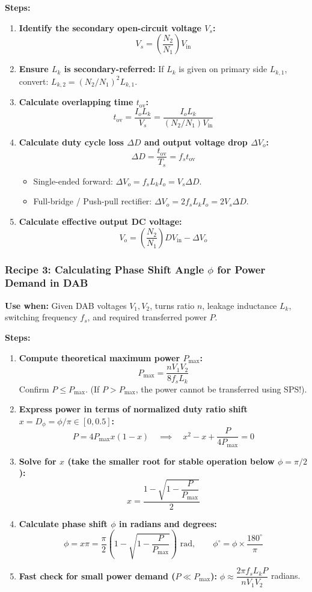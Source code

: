 \textbf{Steps:}
\begin{enumerate}
  \item \textbf{Identify the secondary open-circuit voltage $V_s$:}
  \[
  V_s = \left(\frac{N_2}{N_1}\right) V_{\mathrm{in}}
  \]
  \item \textbf{Ensure $L_k$ is secondary-referred:}
  If $L_k$ is given on primary side $L_{k,1}$, convert: $L_{k,2} = (N_2/N_1)^2 L_{k,1}$.
  \item \textbf{Calculate overlapping time $t_{\mathrm{ov}}$:}
  \[
  t_{\mathrm{ov}} = \frac{I_o L_k}{V_s} = \frac{I_o L_k}{(N_2/N_1) V_{\mathrm{in}}}
  \]
  \item \textbf{Calculate duty cycle loss $\Delta D$ and output voltage drop $\Delta V_o$:}
  \[
  \Delta D = \frac{t_{\mathrm{ov}}}{T_s} = f_s t_{\mathrm{ov}}
  \]
  \begin{itemize}
    \item Single-ended forward: $\Delta V_o = f_s L_k I_o = V_s \Delta D$.
    \item Full-bridge / Push-pull rectifier: $\Delta V_o = 2 f_s L_k I_o = 2 V_s \Delta D$.
  \end{itemize}
  \item \textbf{Calculate effective output DC voltage:}
  \[
  V_o = \left(\frac{N_2}{N_1}\right) D V_{\mathrm{in}} - \Delta V_o
  \]
\end{enumerate}

\subsubsection{Recipe 3: Calculating Phase Shift Angle $\phi$ for Power Demand in DAB}
\textbf{Use when:} Given DAB voltages $V_1, V_2$, turns ratio $n$, leakage inductance $L_k$, switching frequency $f_s$, and required transferred power $P$.

\textbf{Steps:}
\begin{enumerate}
  \item \textbf{Compute theoretical maximum power $P_{\max}$:}
  \[
  P_{\max} = \frac{n V_1 V_2}{8 f_s L_k}
  \]
  Confirm $P \le P_{\max}$. (If $P > P_{\max}$, the power cannot be transferred using SPS!).
  \item \textbf{Express power in terms of normalized duty ratio shift $x = D_\phi = \phi / \pi \in [0, 0.5]$:}
  \[
  P = 4 P_{\max} x (1 - x) \quad\implies\quad x^2 - x + \frac{P}{4 P_{\max}} = 0
  \]
  \item \textbf{Solve for $x$ (take the smaller root for stable operation below $\phi = \pi/2$):}
  \[
  x = \frac{1 - \sqrt{1 - \dfrac{P}{P_{\max}}}}{2}
  \]
  \item \textbf{Calculate phase shift $\phi$ in radians and degrees:}
  \[
  \phi = x \pi = \frac{\pi}{2} \left(1 - \sqrt{1 - \frac{P}{P_{\max}}}\right) \text{ rad}, \qquad \phi^\circ = \phi \times \frac{180^\circ}{\pi}
  \]
  \item \textbf{Fast check for small power demand ($P \ll P_{\max}$):}
  $\phi \approx \dfrac{2\pi f_s L_k P}{n V_1 V_2}$ radians.
\end{enumerate}

